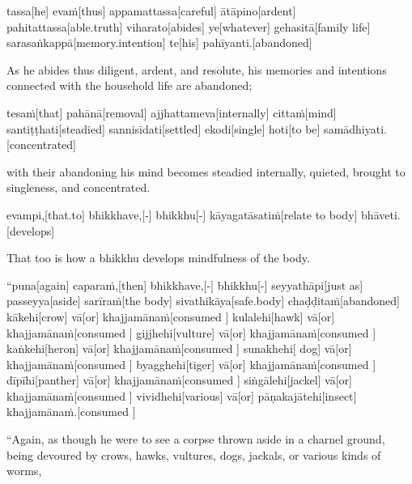 \begin{samepage}
\begingl[glneveryline={\PaliGlossA,\PaliGlossB}]
tassa[he] evaṁ[thus] appamattassa[careful] ātāpino[ardent] pahitattassa[able.truth] viharato[abides] ye[whatever] gehasitā[family life] sarasaṅkappā[memory.intention] te[his] pahīyanti.[abandoned]
\endgl
\nopagebreak
\linespread{0.5}
\begin{spacin}{0.2}
{\PaliGlossFT As he abides thus diligent, ardent, and resolute, his memories and intentions connected with the household life are abandoned;}
\end{spacin}
\vskip 12pt
\end{samepage}
\begin{samepage}
\begingl[glneveryline={\PaliGlossA,\PaliGlossB}]
tesaṁ[that] pahānā[removal] ajjhattameva[internally] cittaṁ[mind] santiṭṭhati[steadied] sannisīdati[settled] ekodi[single] hoti[to be] samādhiyati.[concentrated]
\endgl
\nopagebreak
\linespread{0.5}
\begin{spacin}{0.2}
{\PaliGlossFT with their abandoning his mind becomes steadied internally, quieted, brought to singleness, and concentrated.}
\end{spacin}
\vskip 12pt
\end{samepage}
\begin{samepage}
\begingl[glneveryline={\PaliGlossA,\PaliGlossB}]
evampi,[that.to] bhikkhave,[-] bhikkhu[-] kāyagatāsatiṁ[relate to body] bhāveti.[develops]
\endgl
\nopagebreak
\linespread{0.5}
\begin{spacin}{0.2}
{\PaliGlossFT That too is how a bhikkhu develops mindfulness of the body.}
\end{spacin}
\vskip 12pt
\end{samepage}
\vskip 0.2in
\begin{samepage}
\begingl[glneveryline={\PaliGlossA,\PaliGlossB}]
“puna[again] caparaṁ,[then] bhikkhave,[-] bhikkhu[-] seyyathāpi[just as] passeyya[aside] sarīraṁ[the body] sivathikāya[safe.body] chaḍḍitaṁ[abandoned] kākehi[crow] vā[or] khajjamānaṁ[consumed ] kulalehi[hawk] vā[or] khajjamānaṁ[consumed ] gijjhehi[vulture] vā[or] khajjamānaṁ[consumed ] kaṅkehi[heron] vā[or] khajjamānaṁ[consumed ] sunakhehi[ dog] vā[or] khajjamānaṁ[consumed ] byagghehi[tiger] vā[or] khajjamānaṁ[consumed ] dīpīhi[panther] vā[or] khajjamānaṁ[consumed ] siṅgālehi[jackel] vā[or] khajjamānaṁ[consumed ] vividhehi[various] vā[or] pāṇakajātehi[insect] khajjamānaṁ.[consumed ]
\endgl
\nopagebreak
\linespread{0.5}
\begin{spacin}{0.2}
{\PaliGlossFT “Again, as though he were to see a corpse thrown aside in a charnel ground, being devoured by crows, hawks, vultures, dogs, jackals, or various kinds of worms,}
\end{spacin}
\vskip 12pt
\end{samepage}
